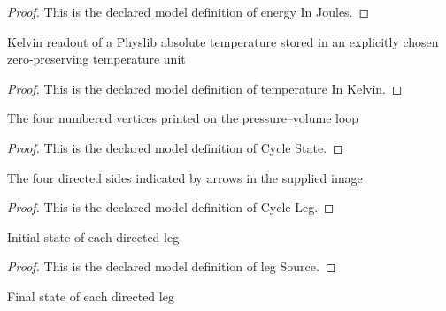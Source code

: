 \begin{proof}
  This is the declared model definition of energy In Joules.
\end{proof}
\begin{definition}
  \label{def:physics:phyx-mini-0425:phyxminiproblems-problemphyxmini0425-temperatureinkelvin}
  Kelvin readout of a Physlib absolute temperature stored in an explicitly chosen zero-preserving temperature unit
\end{definition}
\begin{proof}
  This is the declared model definition of temperature In Kelvin.
\end{proof}
\begin{definition}
  \label{def:physics:phyx-mini-0425:phyxminiproblems-problemphyxmini0425-cyclestate}
  The four numbered vertices printed on the pressure--volume loop
\end{definition}
\begin{proof}
  This is the declared model definition of Cycle State.
\end{proof}
\begin{definition}
  \label{def:physics:phyx-mini-0425:phyxminiproblems-problemphyxmini0425-cycleleg}
  The four directed sides indicated by arrows in the supplied image
\end{definition}
\begin{proof}
  This is the declared model definition of Cycle Leg.
\end{proof}
\begin{definition}
  \label{def:physics:phyx-mini-0425:phyxminiproblems-problemphyxmini0425-legsource}
  Initial state of each directed leg
\end{definition}
\begin{proof}
  This is the declared model definition of leg Source.
\end{proof}
\begin{definition}
  \label{def:physics:phyx-mini-0425:phyxminiproblems-problemphyxmini0425-legtarget}
  Final state of each directed leg
\end{definition}

